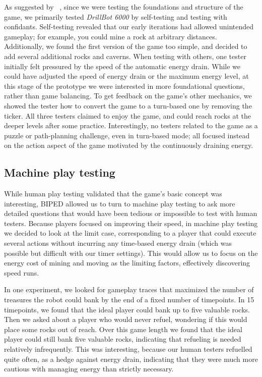 \documentclass[letterpaper]{article}
\newcommand{\citenounpg}[2]{\citeauthor{#2}~\shortcite[#1]{#2}}
\begin{document}
As suggested by \citenounpg{p.\ 252}{Fullerton}, since we were testing the
foundations and structure of the game, we primarily tested \emph{DrillBot
6000} by self-testing and testing with confidants. Self-testing revealed that
our early iterations had allowed unintended gameplay; for example, you could
mine a rock at arbitrary distances. Additionally, we found the first version of
the game too simple, and decided to add several additional rocks and caverns.
When testing with others, one tester initially felt pressured by the speed of
the automatic energy drain. While we could have adjusted the speed of energy
drain or the maximum energy level, at this stage of the prototype we were
interested in more foundational questions, rather than
game balancing. To get feedback on the game's other mechanics, we showed the
tester how to convert the game to a turn-based one by removing the ticker.  All
three testers claimed to enjoy the game, and could reach rocks at the deeper
levels after some practice. Interestingly, no testers related to the game as a
puzzle or path-planning challenge, even in turn-based mode; all focused instead
on the action aspect of the game motivated by the continuously draining energy.

\subsection{Machine play testing}

While human play testing validated that the game's basic concept was
interesting, BIPED allowed us to turn to machine play testing to ask more
detailed questions that would have been tedious or impossible to test with
human testers. Because players focused on improving their speed, in 
machine play testing we decided to look at the limit case, corresponding to a
player that could execute several actions without incurring any time-based
energy drain (which was possible but difficult with our timer settings). This
would allow us to focus on the energy cost of mining and moving as the
limiting factors, effectively discovering speed runs.

In one experiment, we looked for gameplay traces that maximized the number of
treasures the robot could bank by the end of a fixed number of timepoints.  In
15 timepoints, we found that the ideal player could bank up to five valuable
rocks. Then we asked about a player who would never refuel, wondering if
this would place some rocks out of reach. Over this game length we found that
the ideal player could still bank five valuable rocks, indicating that
refueling is needed relatively infrequently. This was interesting, because our
human testers refuelled quite often, as a hedge against energy drain,
indicating that they were much more cautious with managing energy than strictly
necessary.
\end{document}
